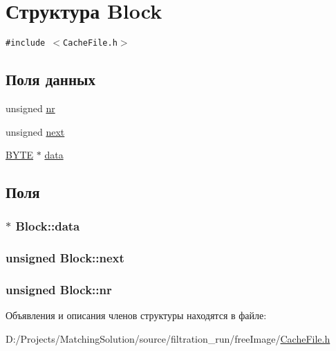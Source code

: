 \hypertarget{struct_block}{
\section{Структура Block}
\label{struct_block}
}
{\tt \#include $<$CacheFile.h$>$}

\subsection*{Поля данных}
\begin{CompactItemize}
\item 
unsigned \hyperlink{struct_block_8a2c57f902ae78af007fc459eb992820}{nr}
\item 
unsigned \hyperlink{struct_block_bc90e39660a2bd32b60566010d3ad1a4}{next}
\item 
\hyperlink{filtration__run_2free_image_2_free_image_8h_ae9749d96e15ccb4f482dd5f55d98f9b}{BYTE} $\ast$ \hyperlink{struct_block_1eee91dadc23eaafdb45eaaf8beeae23}{data}
\end{CompactItemize}


\subsection{Поля}
\hypertarget{struct_block_1eee91dadc23eaafdb45eaaf8beeae23}{
\subsubsection[{data}]{$\ast$ {\bf Block::data}}}
\label{struct_block_1eee91dadc23eaafdb45eaaf8beeae23}


\hypertarget{struct_block_bc90e39660a2bd32b60566010d3ad1a4}{
\subsubsection[{next}]{\setlength{\rightskip}{0pt plus 5cm}unsigned {\bf Block::next}}}
\label{struct_block_bc90e39660a2bd32b60566010d3ad1a4}


\hypertarget{struct_block_8a2c57f902ae78af007fc459eb992820}{
\subsubsection[{nr}]{\setlength{\rightskip}{0pt plus 5cm}unsigned {\bf Block::nr}}}
\label{struct_block_8a2c57f902ae78af007fc459eb992820}




Объявления и описания членов структуры находятся в файле:\begin{CompactItemize}
\item 
D:/Projects/MatchingSolution/source/filtration\_\-run/freeImage/\hyperlink{_cache_file_8h}{CacheFile.h}\end{CompactItemize}
